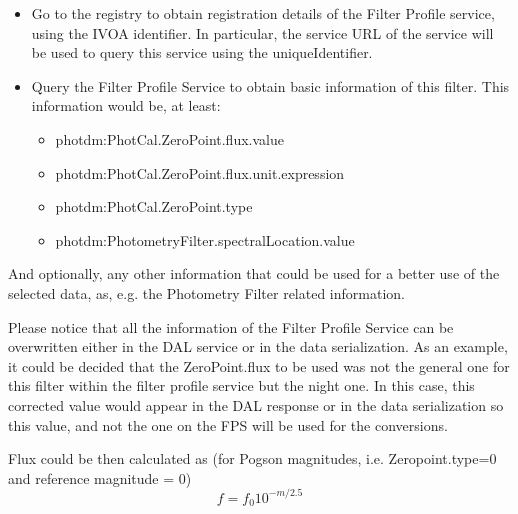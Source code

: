 \documentclass[11pt,a4paper]{ivoa}
\begin{document}
\begin{itemize}
	\item{Go to the registry to obtain registration details of the Filter Profile service, 
	using the IVOA identifier. In particular, the service URL of the service will be used 
	to query this service using the uniqueIdentifier.\par}

	\item{Query the Filter Profile Service to obtain basic information of this filter. This 
	information would be, at least:\par}

\begin{itemize}
	\item photdm:PhotCal.ZeroPoint.flux.value\par

	\item photdm:PhotCal.ZeroPoint.flux.unit.expression\par

	\item photdm:PhotCal.ZeroPoint.type\par

	\item photdm:PhotometryFilter.spectralLocation.value
\end{itemize}
\end{itemize}\par

And optionally, any other information that could be used for a better use of the selected 
data, as, e.g. the Photometry Filter related information.
\par

Please notice that all the information of the Filter Profile Service can be overwritten 
either in the DAL service or in the data serialization. As an example, it could be 
decided that the ZeroPoint.flux to be used was not the general one for this filter 
within the filter profile service but the night one. In this case, this corrected 
value would appear in the DAL response or in the data serialization so this value, 
and not the one on the FPS will be used for the conversions.
\par

Flux could be then calculated as (for Pogson magnitudes, i.e. Zeropoint.type=0 and 
reference magnitude = 0)
\begin{equation} \label{eq:33}
f = f_0 10^{-m/2.5}
\end{equation}
\end{document}
